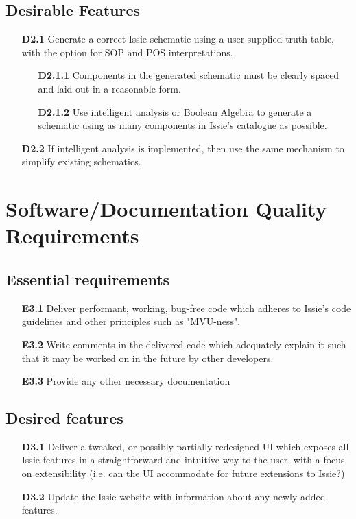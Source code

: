 \subsection*{Desirable Features}
\begin{itemize}
    \item[\textbf{D2.1}] Generate a correct Issie schematic using a user-supplied truth table, with the option for SOP and POS interpretations.
    \begin{itemize}
        \item[\textbf{D2.1.1}] Components in the generated schematic must be clearly spaced and laid out in a reasonable form.
        \item[\textbf{D2.1.2}] Use intelligent analysis or Boolean Algebra to generate a schematic using as many components in Issie's catalogue as possible.
    \end{itemize}
    \medskip
    \item[\textbf{D2.2}] If intelligent analysis is implemented, then use the same mechanism to simplify existing schematics.
\end{itemize}

\section{Software/Documentation Quality Requirements}
\subsection*{Essential requirements}
\begin{itemize}
    \item[\textbf{E3.1}] Deliver performant, working, bug-free code which adheres to Issie's code guidelines and other principles such as "MVU-ness".
    \medskip
    \item[\textbf{E3.2}] Write comments in the delivered code which adequately explain it such that it may be worked on in the future by other developers. 
    \medskip
    \item[\textbf{E3.3}] Provide any other necessary documentation
\end{itemize}

\subsection*{Desired features}
\begin{itemize}
    \item[\textbf{D3.1}] Deliver a tweaked, or possibly partially redesigned UI which exposes all Issie features in a straightforward and intuitive way to the user, with a focus on extensibility (i.e. can the UI accommodate for future extensions to Issie?)
    \medskip
    \item[\textbf{D3.2}] Update the Issie website with information about any newly added features.
\end{itemize}